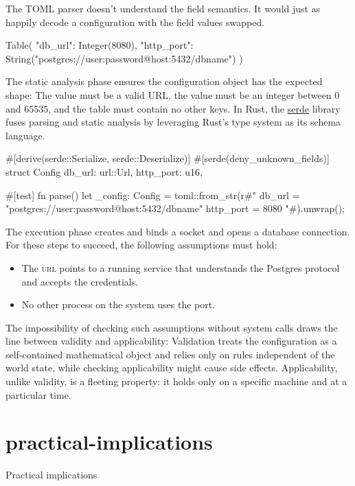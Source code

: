 \documentclass{article}
\begin{document}
The TOML parser doesn't understand the field semantics.
It would just as happily decode a configuration with the field values swapped.

\begin{code}
Table({
  "db_url": Integer(8080),
  "http_port": String("postgres://user:password@host:5432/dbname")
})
\end{code}

The static analysis phase ensures the configuration object has the expected shape:
The  value must be a valid URL,
the  value must be an integer between 0 and 65535,
and the table must contain no other keys.
In Rust, the \href{https://serde.rs}{serde} library fuses parsing and static analysis by leveraging Rust's type system as its schema language.

\begin{code}[rust]
#[derive(serde::Serialize, serde::Deserialize)]
#[serde(deny_unknown_fields)]
struct Config {
    db_url: url::Url,
    http_port: u16,
}

#[test]
fn parse() {
    let _config: Config = toml::from_str(r#"
db_url = "postgres://user:password@host:5432/dbname"
http_port = 8080
"#).unwrap();
}
\end{code}

The execution phase creates and binds a socket and opens a database connection.
For these steps to succeed, the following assumptions must hold:
\begin{itemize}
\item The \textsc{url} points to a running service that understands the Postgres protocol and accepts the credentials.
\item No other process on the system uses the port.
\end{itemize}

The impossibility of checking such assumptions without system calls draws the line between validity and applicability:
Validation treats the configuration as a self-contained mathematical object and relies only on rules independent of the world state,
while checking applicability might cause side effects.
Applicability, unlike validity, is a fleeting property:
it holds only on a specific machine and at a particular time.

\section{practical-implications}{Practical implications}
\end{document}
